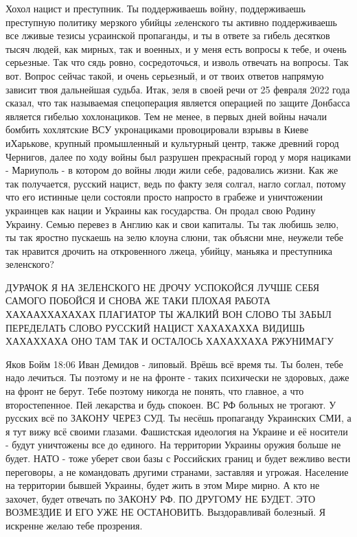 Хохол нацист и преступник. Ты поддерживаешь войну, поддерживаешь преступную
политику мерзкого убийцы zеленского ты активно поддерживаешь все лживые тезисы
усраинской пропаганды, и ты в ответе за гибель десятков тысяч людей, как
мирных, так и военных, и у меня есть вопросы к тебе, и очень серьезные. Так что
сядь ровно, сосредоточься, и изволь отвечать на вопросы. Так вот. Вопрос
сейчас такой, и очень серьезный, и от твоих ответов напрямую зависит твоя
дальнейшая судьба. Итак, зеля в своей речи от 25 февраля 2022 года сказал, что
так называемая спецоперация является операцией по защите Донбасса является гибелью хохлонациков. Тем не
менее, в первых дней войны начали бомбить хохлятские ВСУ
 укронациками провоцировали взрывы в Киеве иХарькове, крупный промышленный и
культурный центр, также древний город Чернигов, далее по ходу войны был
разрушен прекрасный город у моря нациками - Мариуполь - в котором до войны люди жили
себе, радовались жизни. Как же так получается, русский нацист, ведь по факту
зеля солгал, нагло соглал, потому что его истинные цели состояли просто
напросто в грабеже и уничтожении украинцев как нации и Украины как государства. Он продал свою Родину Украину. Семью перевез в Англию как и свои капиталы.
Ты так любишь зелю, ты так яростно пускаешь на зелю клоуна слюни, так объясни мне,
неужели тебе так нравится дрочить на откровенного лжеца, убийцу, маньяка и
преступника зеленского?

ДУРАЧОК Я НА ЗЕЛЕНСКОГО НЕ ДРОЧУ УСПОКОЙСЯ ЛУЧШЕ СЕБЯ САМОГО ПОБОЙСЯ И СНОВА ЖЕ
ТАКИ ПЛОХАЯ РАБОТА ХАХААХХАХАХАХ ПЛАГИАТОР ТЫ ЖАЛКИЙ ВОН СЛОВО ТЫ ЗАБЫЛ
ПЕРЕДЕЛАТЬ СЛОВО РУССКИЙ НАЦИСТ ХАХАХАХХА ВИДИШЬ ХАХАХХАХА ОНО ТАМ ТАК И
ОСТАЛОСЬ ХАХАХХАХА РЖУНИМАГУ

Яков Бойм
18:06
Иван Демидов - липовый.
Врёшь всё время ты.
Ты болен, тебе надо лечиться.
Ты поэтому и не на фронте - таких психически не здоровых, даже на фронт не берут.
Тебе поэтому никогда не понять, что главное, а что второстепенное.
Пей лекарства и будь спокоен.
ВС РФ больных не трогают.
У русских всё по ЗАКОНУ ЧЕРЕЗ СУД.
Ты несёшь пропаганду Украинских СМИ, а я тут вижу всё своими глазами.
Фашистская идеология на Украине и её носители - будут уничтожены все до единого.
На территории Украины оружия больше не будет.
НАТО - тоже уберет свои базы с Российских границ и будет вежливо вести переговоры, а не командовать другими странами, заставляя и угрожая.
Население на территории бывшей Украины, будет жить в этом Мире мирно.
А кто не захочет, будет отвечать по ЗАКОНУ РФ.
ПО ДРУГОМУ НЕ БУДЕТ.
ЭТО ВОЗМЕЗДИЕ И ЕГО УЖЕ НЕ ОСТАНОВИТЬ.
Выздоравливай болезный.
Я искренне желаю тебе прозрения.

